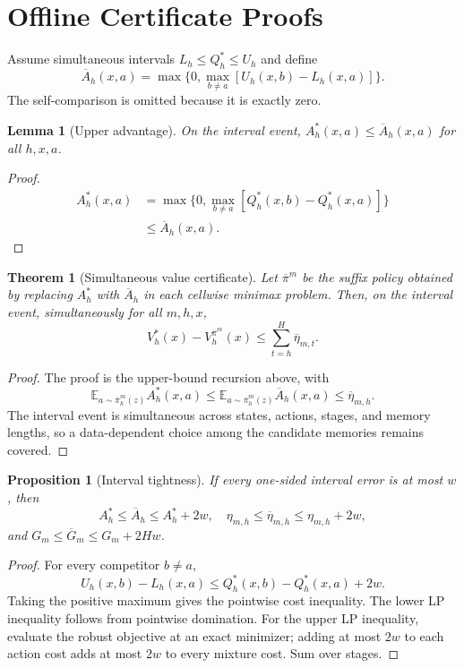 \documentclass[letterpaper]{article} %
\newtheorem{theorem}{Theorem}
\newtheorem{proposition}{Proposition}
\newtheorem{lemma}{Lemma}
\newcommand{\E}{\mathbb E}
\begin{document}
\section{Offline Certificate Proofs}

Assume simultaneous intervals \(L_h\leq Q_h^*\leq U_h\) and define
\[
\overline A_h(x,a)=
\max\{0,\max_{b\neq a}[U_h(x,b)-L_h(x,a)]\}.
\]
The self-comparison is omitted because it is exactly zero.

\begin{lemma}[Upper advantage]
On the interval event,
\(A_h^*(x,a)\leq\overline A_h(x,a)\) for all \(h,x,a\).
\end{lemma}
\begin{proof}
\[
\begin{aligned}
A_h^*(x,a)
&=\max\{0,\max_{b\neq a}
  [Q_h^*(x,b)-Q_h^*(x,a)]\}\\
&\leq\overline A_h(x,a).
\end{aligned}
\]
\end{proof}

\begin{theorem}[Simultaneous value certificate]
Let \(\overline\pi^m\) be the suffix policy obtained by replacing \(A_h^*\)
with \(\overline A_h\) in each cellwise minimax problem.  Then, on the
interval event, simultaneously for all \(m,h,x\),
\[
V_h^*(x)-V_h^{\overline\pi^m}(x)
\leq\sum_{t=h}^H\overline\eta_{m,t}.
\]
\end{theorem}
\begin{proof}
The proof is the upper-bound recursion above, with
\[
\E_{a\sim\overline\pi_h^m(z)}A_h^*(x,a)
\leq\E_{a\sim\overline\pi_h^m(z)}\overline A_h(x,a)
\leq\overline\eta_{m,h}.
\]
The interval event is simultaneous across states, actions, stages, and memory
lengths, so a data-dependent choice among the candidate memories remains
covered.
\end{proof}

\begin{proposition}[Interval tightness]
If every one-sided interval error is at most \(w\), then
\[
A_h^*\leq\overline A_h\leq A_h^*+2w,
\quad
\eta_{m,h}\leq\overline\eta_{m,h}\leq\eta_{m,h}+2w,
\]
and \(G_m\leq\overline G_m\leq G_m+2Hw\).
\end{proposition}
\begin{proof}
For every competitor \(b\neq a\),
\[
U_h(x,b)-L_h(x,a)
\leq Q_h^*(x,b)-Q_h^*(x,a)+2w.
\]
Taking the positive maximum gives the pointwise cost inequality.  The lower
LP inequality follows from pointwise domination.  For the upper LP inequality,
evaluate the robust objective at an exact minimizer; adding at most \(2w\) to
each action cost adds at most \(2w\) to every mixture cost.  Sum over stages.
\end{proof}
\end{document}
